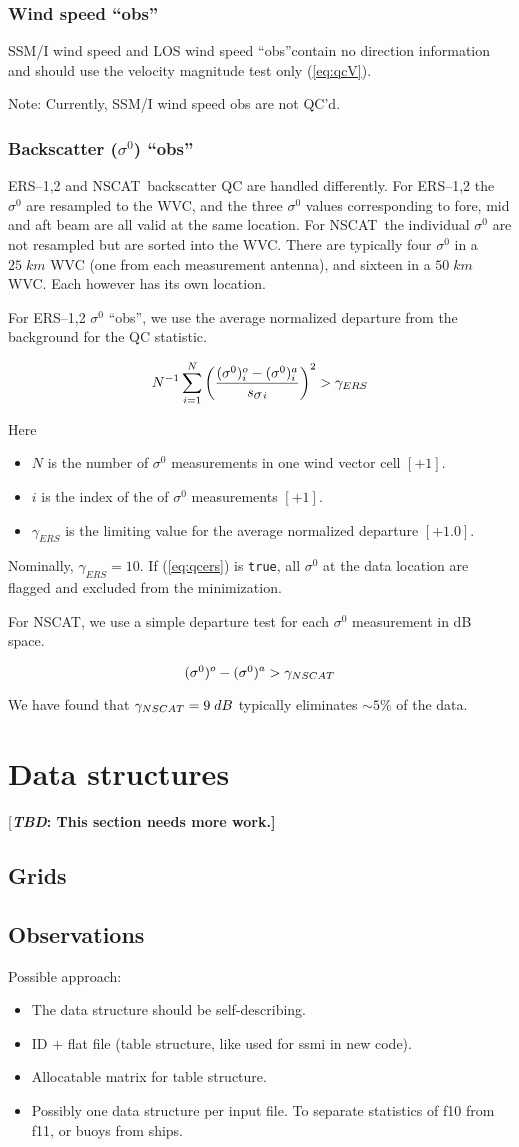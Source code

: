 \documentclass[11pt]{article}
\newcommand{\computer}[1]{{\tt #1}}
\newcommand{\ers}[1]{ERS--{#1}}
\newcommand{\mks}[2]{\mbox{$ {#1} \; {#2} $}}
\newcommand{\nscat}{NSCAT}
\newcommand{\obs}{``obs''}
\newcommand{\s}[1]{\mbox{$ \sigma^{#1} $}}
\newcommand{\xx}[1]{\section {#1}}
\newcommand{\xxx}[1]{\subsection {#1}}
\newcommand{\xxxx}[1]{\subsubsection {#1}}
\newcommand{\TBD}[1]{{[\bfseries{\itshape{TBD: }{{#1}}}]}}
\newcommand{\eql}[2]{\begin{equation} \label{eq:#1} #2 \end{equation}}
\newcommand{\eqr}[1]{(\ref{eq:#1})}
\newcommand{\COMMENT}[2]{{[\bfseries {\itshape #1}: {#2}]}}
\renewcommand{\TBD}[1]{\COMMENT{TBD}{{#1}}}
\newcommand{\vardef}[3]{\item $ {#1} $ is the {#2} $ [{#3}] $. }
\begin{document}
\xxxx {Wind speed \obs}

SSM/I wind speed and LOS wind speed \obs contain no direction
information and should use the velocity magnitude test only \eqr{qcV}.

Note: Currently, SSM/I wind speed obs are not QC'd.

\xxxx {Backscatter (\s0) \obs}

\ers1,2 and \nscat\ backscatter QC are handled differently.
For \ers1,2 the \s0 are resampled to the WVC, and the three \s0 values
corresponding to fore, mid and aft beam are all valid at the same
location.  For \nscat\ the individual \s0 are not resampled but are
sorted into the WVC.  There are typically four \s0 in a \mks{25}{km}
WVC (one from each measurement antenna), and sixteen in a
\mks{50}{km} WVC. Each however has its own location.

For \ers1,2 \s0 \obs, we use the average normalized departure
from the background for the QC statistic.

 \eql{qcers}{ N^{-1} \sum_{i=1}^{N}
   \left( \frac{(\s0)^o_i - (\s0)^a_i}{s_{\s{}i}} \right)^2 > \gamma_{ERS}}

 Here \begin{itemize}
  \vardef{N}{number of \s0 measurements in one wind vector cell}{+1}
  \vardef{i}{index of the of \s0 measurements}{+1}
  \vardef{ \gamma_{ERS}}{limiting value for the average normalized departure}{+1.0}
 \end{itemize} 

Nominally, $\gamma_{ERS} = 10$.  If \eqr{qcers} is \computer{true},
all \s0 at the data location are flagged and excluded from the
minimization.

For NSCAT, we use a simple departure test for each \s0 measurement
in dB space.

\eql{qcnscat}{(\s0)^o - (\s0)^a > \gamma_{NSCAT}}

We have found that $\gamma_{NSCAT} = \mks{9}{dB}$ typically eliminates
$\sim 5\%$ of the data.

\xx {Data structures}

\TBD{This section needs more work.}

\xxx {Grids}

\xxx {Observations}

Possible approach:
 \begin{itemize}

\item The data structure should be self-describing.

\item ID + flat file (table structure, like used for ssmi in new code).

\item Allocatable matrix for table structure.

\item Possibly one data structure per input file.  To separate statistics of
f10 from f11, or buoys from ships.

\end{itemize}
\end{document}
